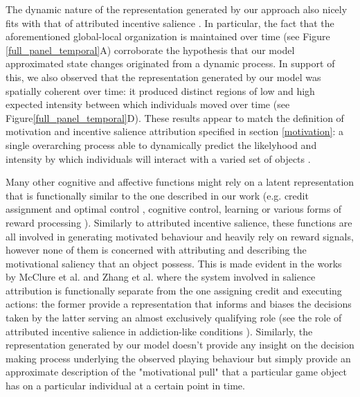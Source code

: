 The dynamic nature of the representation generated by our approach also nicely fits with that of attributed incentive salience \cite{toates1994comparing,robinson1993neural,zhang2009neural,tindell2009dynamic,berridge2012prediction}. In particular, the fact that the aforementioned global-local organization is maintained over time (see Figure \ref{full_panel_temporal}A) corroborate the hypothesis that our model approximated state changes originated from a dynamic process. In support of this, we also observed that the representation generated by our model was spatially coherent over time: it produced distinct regions of low and high expected intensity between which individuals moved over time (see Figure\ref{full_panel_temporal}D). These results appear to match the definition of motivation and incentive salience attribution specified in section \ref{motivation}: a single overarching process able to dynamically predict the likelyhood and intensity by which individuals will interact with a varied set of objects \cite{simpson2016behavioral,toates1994comparing,berridge2004motivation,zhang2009neural}. 

Many other cognitive and affective functions might rely on a latent representation that is functionally similar to the one described in our work (e.g. credit assignment and optimal control \cite{wang2018prefrontal, barto2004reinforcement}, cognitive control, learning \cite{skinner1965science} or various forms of reward processing \cite{schultz1997neural, schultz2000reward}). Similarly to attributed incentive salience, these functions are all involved in generating motivated behaviour and heavily rely on reward signals, however none of them is concerned with attributing and describing the motivational saliency that an object possess. This is made evident in the works by McClure et al. \cite{mcclure2003computational} and Zhang et al. \cite{zhang2009neural} where the system involved in salience attribution is functionally separate from the one assigning credit and executing actions: the former provide a representation that informs and biases the decisions taken by the latter serving an almost exclusively qualifying role (see the role of attributed incentive salience in addiction-like conditions \cite{robinson1993neural}). Similarly, the representation generated by our model doesn't provide any insight on the decision making process underlying the observed playing behaviour but simply provide an approximate description of the "motivational pull" that a particular game object has on a particular individual at a certain point in time. 

